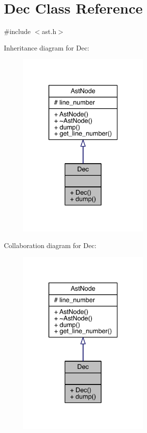\hypertarget{class_dec}{}\section{Dec Class Reference}
\label{class_dec}


{\ttfamily \#include $<$ast.\+h$>$}



Inheritance diagram for Dec\+:\nopagebreak
\begin{figure}[H]
\begin{center}
\leavevmode
\includegraphics[width=186pt]{class_dec__inherit__graph}
\end{center}
\end{figure}


Collaboration diagram for Dec\+:\nopagebreak
\begin{figure}[H]
\begin{center}
\leavevmode
\includegraphics[width=186pt]{class_dec__coll__graph}
\end{center}
\end{figure}
